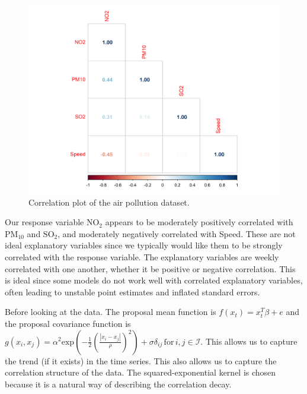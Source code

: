 \documentclass[a4paper, 10pt]{article}
\begin{document}
\begin{flushleft}
      \begin{figure}[H]
         \centering
         \includegraphics[width=0.48\linewidth]{../img/corrplot_2019.png}
         \caption{Correlation plot of the air pollution dataset.}
      \end{figure}

      Our response variable $\text{NO}_{2}$ appears to be moderately positively correlated with $\text{PM}_{10}$ and $\text{SO}_{2}$, and moderately negatively correlated with Speed. These are not ideal explanatory variables since we typically would like them to be strongly correlated with the response variable. The explanatory variables are weekly correlated with one another, whether it be positive or negative correlation. This is ideal since some models do not work well with correlated explanatory variables, often leading to unstable point estimates and inflated standard errors.

      \vspace{1em}

      Before looking at the data. The proposal mean function is $f(x_{t}) = x_{t}^{T} \beta + e$ and the proposal covariance function is $g(x_{i}, x_{j}) = \alpha^{2} \text{exp}(- \frac{1}{2} (\frac{|x_i - x_j|}{\rho})^2) + \sigma\delta_{ij} \, \text{for} \, i,j \in \mathcal{I}$. This allows us to capture the trend (if it exists) in the time series. This also allows us to capture the correlation structure of the data. The squared-exponential kernel is chosen because it is a natural way of describing the correlation decay.


\end{flushleft}
\end{document}
